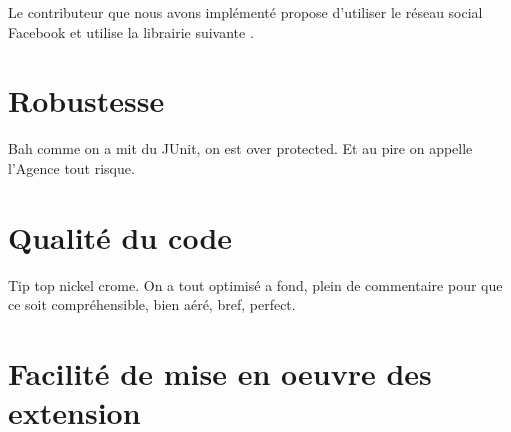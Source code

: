 			Le contributeur que nous avons implémenté propose d'utiliser le réseau social Facebook et utilise la librairie suivante \cite{restFB}.

\section{Robustesse}
	Bah comme on a mit du JUnit, on est over protected. Et au pire on appelle l'Agence tout risque.
	
\section{Qualité du code}
	Tip top nickel crome. On a tout optimisé a fond, plein de commentaire pour que ce soit compréhensible, bien aéré, bref, perfect.
	
\section{Facilité de mise en oeuvre des extension}
	
